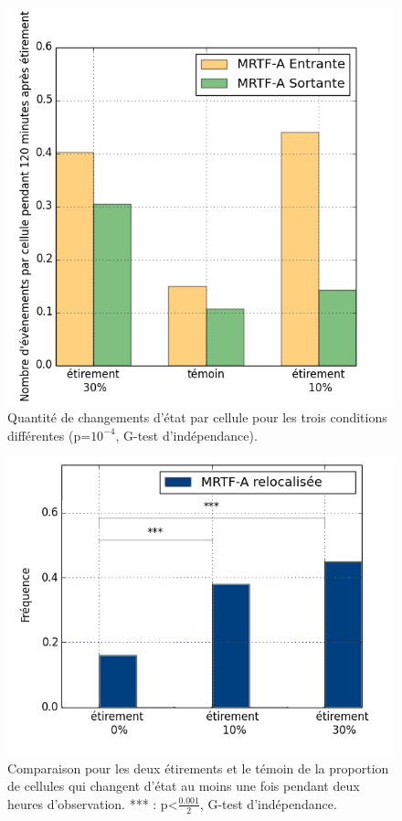 \begin{figure}
\includegraphics[scale=0.5]{Figures/Etirement30_vs_temoin_activite.png}
\caption{\label{Et30_activite} Quantité de changements d'état par cellule pour les trois conditions différentes (p=$10^{-4}$, G-test d'indépendance).}
\end{figure}
\begin{figure}
 \includegraphics[scale=0.5]{Figures/Activite.png} 
 \caption{\label{Et30_ES} Comparaison pour les deux étirements et le témoin de la proportion de cellules qui changent d'état au moins une fois pendant deux heures d'observation. *** : p<$\frac{0.001}{2}$, G-test d'indépendance.}
 \end{figure}
 

